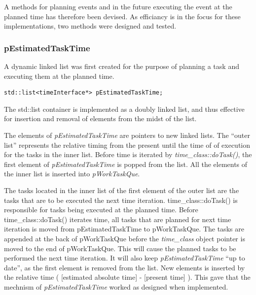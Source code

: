 	A methods for planning events and in the future executing the event at the planned time has therefore been devised.
	As efficiancy is in the focus for these implementations, two methods were designed and tested.
	
	\subsubsection{pEstimatedTaskTime}
	A dynamic linked list was first created for the purpose of planning a task and executing them at the planned time.
\begin{lstlisting}
std::list<timeInterface*> pEstimatedTaskTime;
\end{lstlisting}
	The std::list container is implemented as a doubly linked list\cite{Stroustrup2000KAP16}, and thus effective for insertion and removal of elements from the midst of the list.

	The elements of \emph{pEstimatedTaskTime} are pointers to new linked lists.
	The ``outer list'' represents the relative timing from the present until the time of of execution for the tasks in the inner list.
	Before time is iterated by \emph{time\_class::doTask()}, the first element of \emph{pEstimatedTaskTime} is popped from the list. 
	All the elements of the inner list is inserted into \emph{pWorkTaskQue}.




	The tasks located in the inner list of the first element of the outer list are the tasks that are to be executed the next time iteration.
	time\_class::doTask() is responsible for tasks being executed at the planned time. 
	Before time\_class::doTask() iterates time, all tasks that are planned for next time iteration is moved from pEstimatedTaskTime to pWorkTaskQue.
	The tasks are appended at the back of pWorkTaskQue before the \emph{time\_class} object pointer is moved to the end of pWorkTaskQue. 
	This will cause the planned tasks to be performed the next time iteration.
	It will also keep \emph{pEstimatedTaskTime} ``up to date'', as the first element is removed from the list.
	New elements is inserted by the relative time ( [estimated absolute time] - [present time] ).
	This gave that the mechnism of \emph{pEstimatedTaskTime} worked as designed when implemented.

